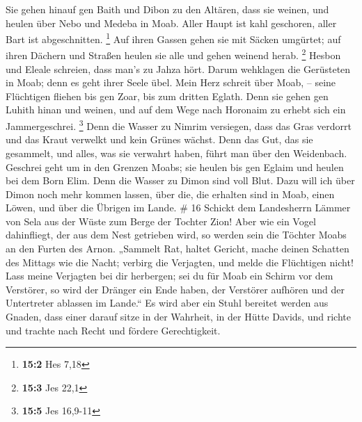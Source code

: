  Sie gehen hinauf gen Baith und Dibon zu den Altären, dass
sie weinen, und heulen über Nebo und Medeba in Moab. Aller Haupt ist
kahl geschoren, aller Bart ist abgeschnitten. \footnote{\textbf{15:2}
  Hes 7,18}  Auf ihren Gassen gehen sie mit Säcken
umgürtet; auf ihren Dächern und Straßen heulen sie alle und gehen
weinend herab. \footnote{\textbf{15:3} Jes 22,1}  Hesbon
und Eleale schreien, dass man's zu Jahza hört. Darum wehklagen die
Gerüsteten in Moab; denn es geht ihrer Seele übel.  Mein
Herz schreit über Moab, -- seine Flüchtigen fliehen bis gen Zoar, bis
zum dritten Eglath. Denn sie gehen gen Luhith hinan und weinen, und auf
dem Wege nach Horonaim zu erhebt sich ein Jammergeschrei. \footnote{\textbf{15:5}
  Jes 16,9-11}  Denn die Wasser zu Nimrim versiegen, dass
das Gras verdorrt und das Kraut verwelkt und kein Grünes wächst.
 Denn das Gut, das sie gesammelt, und alles, was sie
verwahrt haben, führt man über den Weidenbach.  Geschrei
geht um in den Grenzen Moabs; sie heulen bis gen Eglaim und heulen bei
dem Born Elim.  Denn die Wasser zu Dimon sind voll Blut.
Dazu will ich über Dimon noch mehr kommen lassen, über die, die erhalten
sind in Moab, einen Löwen, und über die Übrigen im Lande. \# 16
 Schickt dem Landesherrn Lämmer von Sela aus der Wüste zum
Berge der Tochter Zion!  Aber wie ein Vogel dahinfliegt,
der aus dem Nest getrieben wird, so werden sein die Töchter Moabs an den
Furten des Arnon.  „Sammelt Rat, haltet Gericht, mache
deinen Schatten des Mittags wie die Nacht; verbirg die Verjagten, und
melde die Flüchtigen nicht!  Lass meine Verjagten bei dir
herbergen; sei du für Moab ein Schirm vor dem Verstörer, so wird der
Dränger ein Ende haben, der Verstörer aufhören und der Untertreter
ablassen im Lande.``  Es wird aber ein Stuhl bereitet
werden aus Gnaden, dass einer darauf sitze in der Wahrheit, in der Hütte
Davids, und richte und trachte nach Recht und fördere Gerechtigkeit.

